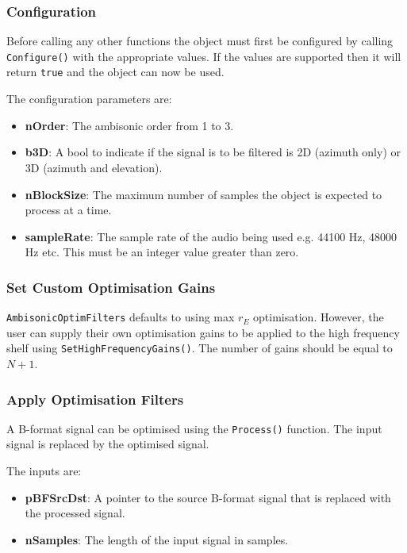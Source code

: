 \documentclass[12pt]{report}
\newcommand{\code}[1]{\texttt{#1}}
\begin{document}
\subsubsection{Configuration}

Before calling any other functions the object must first be configured by calling \code{Configure()} with the appropriate values. If the values are supported then it will return \code{true} and the object can now be used.

The configuration parameters are:
\begin{itemize}
    \item \textbf{nOrder}: The ambisonic order from 1 to 3.
    \item \textbf{b3D}: A bool to indicate if the signal is to be filtered is 2D (azimuth only) or 3D (azimuth and elevation).
    \item \textbf{nBlockSize}: The maximum number of samples the object is expected to process at a time.
    \item \textbf{sampleRate}: The sample rate of the audio being used e.g. 44100 Hz, 48000 Hz etc. This must be an integer value greater than zero.
\end{itemize}

\subsubsection{Set Custom Optimisation Gains}

\code{AmbisonicOptimFilters} defaults to using max $r_{E}$ optimisation. However, the user can supply their own optimisation gains to be applied to the high frequency shelf using \code{SetHighFrequencyGains()}. The number of gains should be equal to $N + 1$.

\subsubsection{Apply Optimisation Filters}

A B-format signal can be optimised using the \code{Process()} function. The input signal is replaced by the optimised signal.

The inputs are:
\begin{itemize}
    \item \textbf{pBFSrcDst}: A pointer to the source B-format signal that is replaced with the processed signal.
    \item \textbf{nSamples}: The length of the input signal in samples.
\end{itemize}
\end{document}
